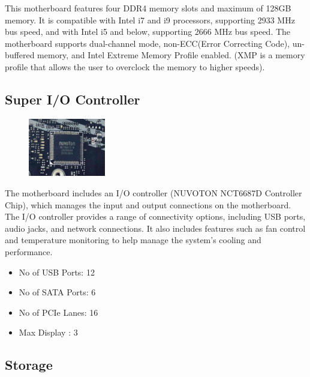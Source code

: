 \documentclass{article}
\begin{document}
This motherboard features four DDR4 memory slots and maximum of 128GB 
memory. It is compatible with Intel i7 and i9 processors, supporting 2933 MHz bus speed,
and with Intel i5 and below, supporting 2666 MHz bus speed. The motherboard supports 
dual-channel mode, non-ECC(Error Correcting Code), un-buffered memory, and Intel Extreme 
Memory Profile enabled. (XMP is a memory profile that allows the user to overclock the 
 memory to higher speeds).


\subsection{Super I/O Controller}

\begin{figure}
	\centering
	\includegraphics[width=0.3\textwidth]{nuvoton.jpg}
\end{figure}


The motherboard includes an I/O controller (NUVOTON NCT6687D Controller Chip), which
manages the input and output connections on the motherboard. The I/O controller provides
a range of connectivity options, including USB ports, audio jacks, and network connections.
It also includes features such as fan control and temperature monitoring to help manage the 
system's cooling and performance.

\begin{multicols}{2}
	\begin{itemize}
		\item No of USB Ports: 12
		\item No of SATA Ports: 6
		\item No of PCIe Lanes: 16
		\item Max Display : 3
	\end{itemize}
\end{multicols}


\subsection{Storage}
\end{document}
